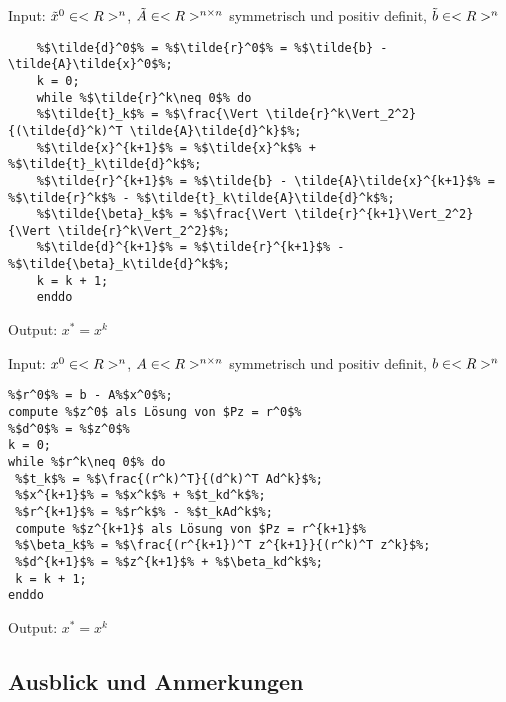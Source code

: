 \begin{algorithm}[CG-Verfahren für $\tilde{A}\tilde{x}=\tilde{b}$]
	Input: $\tilde{x}^0\in<R>^n$, $\tilde{A}\in<R>^{n \times n}$ symmetrisch und positiv definit, $\tilde{b}\in<R>^n$
	\begin{lstlisting}
	%$\tilde{d}^0$% = %$\tilde{r}^0$% = %$\tilde{b} - \tilde{A}\tilde{x}^0$%;
	k = 0;
	while %$\tilde{r}^k\neq 0$% do
	%$\tilde{t}_k$% = %$\frac{\Vert \tilde{r}^k\Vert_2^2}{(\tilde{d}^k)^T \tilde{A}\tilde{d}^k}$%;
	%$\tilde{x}^{k+1}$% = %$\tilde{x}^k$% + %$\tilde{t}_k\tilde{d}^k$%;
	%$\tilde{r}^{k+1}$% = %$\tilde{b} - \tilde{A}\tilde{x}^{k+1}$% = %$\tilde{r}^k$% - %$\tilde{t}_k\tilde{A}\tilde{d}^k$%;
	%$\tilde{\beta}_k$% = %$\frac{\Vert \tilde{r}^{k+1}\Vert_2^2}{\Vert \tilde{r}^k\Vert_2^2}$%;
	%$\tilde{d}^{k+1}$% = %$\tilde{r}^{k+1}$% - %$\tilde{\beta}_k\tilde{d}^k$%;
	k = k + 1;
	enddo
	\end{lstlisting}
	Output: $x^\ast=x^k$
\end{algorithm}

\begin{algorithm}
	Input: $x^0\in<R>^n$, $A\in<R>^{n \times n}$ symmetrisch und positiv definit, $b\in<R>^n$
	\begin{lstlisting}
%$r^0$% = b - A%$x^0$%;
compute %$z^0$ als Lösung von $Pz = r^0$% 
%$d^0$% = %$z^0$%
k = 0;
while %$r^k\neq 0$% do
 %$t_k$% = %$\frac{(r^k)^T}{(d^k)^T Ad^k}$%;
 %$x^{k+1}$% = %$x^k$% + %$t_kd^k$%;
 %$r^{k+1}$% = %$r^k$% - %$t_kAd^k$%;
 compute %$z^{k+1}$ als Lösung von $Pz = r^{k+1}$%
 %$\beta_k$% = %$\frac{(r^{k+1})^T z^{k+1}}{(r^k)^T z^k}$%;
 %$d^{k+1}$% = %$z^{k+1}$% + %$\beta_kd^k$%;
 k = k + 1;
enddo
	\end{lstlisting}
	Output: $x^\ast=x^k$
\end{algorithm}

\subsection{Ausblick und Anmerkungen}

